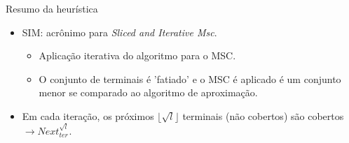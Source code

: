 \documentclass[10pt]{beamer}
\begin{document}
\begin{frame}{Resumo da heurística}
  \begin{itemize}
    \item SIM: acrônimo para \emph{Sliced and Iterative Msc}.
    \begin{itemize}
      \item Aplicação iterativa do algoritmo para o MSC.
      \item O conjunto de terminais é 'fatiado' e o MSC é aplicado é um conjunto menor se comparado ao algoritmo de aproximação.
    \end{itemize}
    \item Em cada iteração, os próximos $\lfloor\sqrt{l}\rfloor$ terminais (não cobertos) são cobertos $\rightarrow Next^{\sqrt{l}}_{ter}$.
  \end{itemize}
\end{frame}
\end{document}

